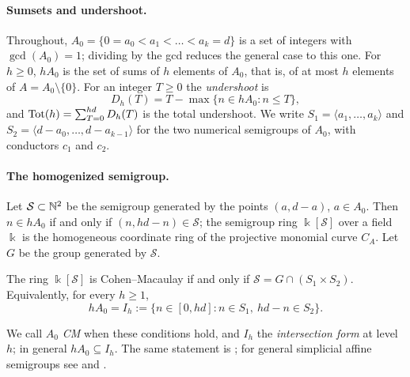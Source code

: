 \paragraph{Sumsets and undershoot.} Throughout, $A_0=\{0=a_0<a_1<\dots<a_k=d\}$ is a set of integers with $\gcd(A_0)=1$; dividing by the gcd reduces the general case to this one. For $h\ge0$, $hA_0$ is the set of sums of $h$ elements of $A_0$, that is, of at most $h$ elements of $A=A_0\setminus\{0\}$. For an integer $T\ge0$ the \emph{undershoot} is
\[
D_h(T)=T-\max\{n\in hA_0: n\le T\},
\]
and $\operatorname{Tot}(h)=\sum_{T=0}^{hd}D_h(T)$ is the total undershoot. We write $S_1=\langle a_1,\dots,a_k\rangle$ and $S_2=\langle d-a_0,\dots,d-a_{k-1}\rangle$ for the two numerical semigroups of $A_0$, with conductors $c_1$ and $c_2$.

\paragraph{The homogenized semigroup.} Let $\mathcal S\subset\mathbb{N}^2$ be the semigroup generated by the points $(a,d-a)$, $a\in A_0$. Then $n\in hA_0$ if and only if $(n,hd-n)\in\mathcal S$; the semigroup ring $\Bbbk[\mathcal S]$ over a field $\Bbbk$ is the homogeneous coordinate ring of the projective monomial curve $C_A$. Let $G$ be the group generated by $\mathcal S$.

\begin{theorem}\label{thm:cm}
The ring $\Bbbk[\mathcal S]$ is Cohen--Macaulay if and only if $\mathcal S=G\cap(S_1\times S_2)$. Equivalently, for every $h\ge1$,
\[
hA_0=I_h:=\{n\in[0,hd]: n\in S_1,\ hd-n\in S_2\}.
\]
\end{theorem}

We call $A_0$ \emph{CM} when these conditions hold, and $I_h$ the \emph{intersection form} at level $h$; in general $hA_0\subseteq I_h$. The same statement is \cite[Prop.~2.6]{GimenezGonzalezSanchez2023}; for general simplicial affine semigroups see \cite[Thm.~(2.6)]{GotoSuzukiWatanabe1976} and \cite[Cor.~4.4]{TrungHoa1986}.


